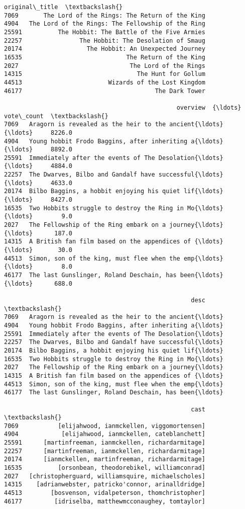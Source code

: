 \documentclass[11pt]{article}
\begin{document}
\begin{tcolorbox}[breakable, size=fbox, boxrule=.5pt, pad at break*=1mm, opacityfill=0]
\begin{Verbatim}[commandchars=\\\{\}]
                                          original\_title  \textbackslash{}
7069       The Lord of the Rings: The Return of the King
4904   The Lord of the Rings: The Fellowship of the Ring
25591          The Hobbit: The Battle of the Five Armies
22257                The Hobbit: The Desolation of Smaug
20174                  The Hobbit: An Unexpected Journey
16535                             The Return of the King
2027                               The Lord of the Rings
14315                                The Hunt for Gollum
44513                        Wizards of the Lost Kingdom
46177                                     The Dark Tower

                                                overview  {\ldots} vote\_count  \textbackslash{}
7069   Aragorn is revealed as the heir to the ancient{\ldots}  {\ldots}     8226.0
4904   Young hobbit Frodo Baggins, after inheriting a{\ldots}  {\ldots}     8892.0
25591  Immediately after the events of The Desolation{\ldots}  {\ldots}     4884.0
22257  The Dwarves, Bilbo and Gandalf have successful{\ldots}  {\ldots}     4633.0
20174  Bilbo Baggins, a hobbit enjoying his quiet lif{\ldots}  {\ldots}     8427.0
16535  Two Hobbits struggle to destroy the Ring in Mo{\ldots}  {\ldots}        9.0
2027   The Fellowship of the Ring embark on a journey{\ldots}  {\ldots}      187.0
14315  A British fan film based on the appendices of {\ldots}  {\ldots}       30.0
44513  Simon, son of the king, must flee when the emp{\ldots}  {\ldots}        8.0
46177  The last Gunslinger, Roland Deschain, has been{\ldots}  {\ldots}      688.0

                                                    desc  \textbackslash{}
7069   Aragorn is revealed as the heir to the ancient{\ldots}
4904   Young hobbit Frodo Baggins, after inheriting a{\ldots}
25591  Immediately after the events of The Desolation{\ldots}
22257  The Dwarves, Bilbo and Gandalf have successful{\ldots}
20174  Bilbo Baggins, a hobbit enjoying his quiet lif{\ldots}
16535  Two Hobbits struggle to destroy the Ring in Mo{\ldots}
2027   The Fellowship of the Ring embark on a journey{\ldots}
14315  A British fan film based on the appendices of {\ldots}
44513  Simon, son of the king, must flee when the emp{\ldots}
46177  The last Gunslinger, Roland Deschain, has been{\ldots}

                                                    cast  \textbackslash{}
7069           [elijahwood, ianmckellen, viggomortensen]
4904            [elijahwood, ianmckellen, cateblanchett]
25591      [martinfreeman, ianmckellen, richardarmitage]
22257      [martinfreeman, ianmckellen, richardarmitage]
20174      [ianmckellen, martinfreeman, richardarmitage]
16535          [orsonbean, theodorebikel, williamconrad]
2027   [christopherguard, williamsquire, michaelscholes]
14315    [adrianwebster, patricko'connor, arinalldridge]
44513        [bosvenson, vidalpeterson, thomchristopher]
46177         [idriselba, matthewmcconaughey, tomtaylor]


\end{Verbatim}
\end{tcolorbox}
\end{document}

